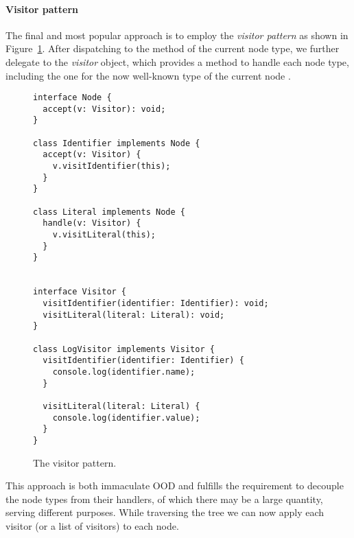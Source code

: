 \paragraph{Visitor pattern}
The final and most popular approach is
to employ the \textit{visitor pattern}
as shown in Figure~\ref{fig:TreeNodeVisitorPattern}.
\autocite{DesignPatterns}
After dispatching to the  method
of the current node type,
we further delegate to the \textit{visitor} object,
which provides a method to handle each node type,
including the one for the now well-known type
of the current node .

\begin{figure}
  \begin{verbatim}
interface Node {
  accept(v: Visitor): void;
}

class Identifier implements Node {
  accept(v: Visitor) {
    v.visitIdentifier(this);
  }
}

class Literal implements Node {
  handle(v: Visitor) {
    v.visitLiteral(this);
  }
}


interface Visitor {
  visitIdentifier(identifier: Identifier): void;
  visitLiteral(literal: Literal): void;
}

class LogVisitor implements Visitor {
  visitIdentifier(identifier: Identifier) {
    console.log(identifier.name);
  }

  visitLiteral(literal: Literal) {
    console.log(identifier.value);
  }
}
  \end{verbatim}
  \caption{
    The visitor pattern.
  }\label{fig:TreeNodeVisitorPattern}
\end{figure}

This approach is both immaculate OOD and
fulfills the requirement to
decouple the node types from their handlers,
of which there may be a large quantity,
serving different purposes.
While traversing the tree we can now apply each visitor
(or a list of visitors) to each node.
